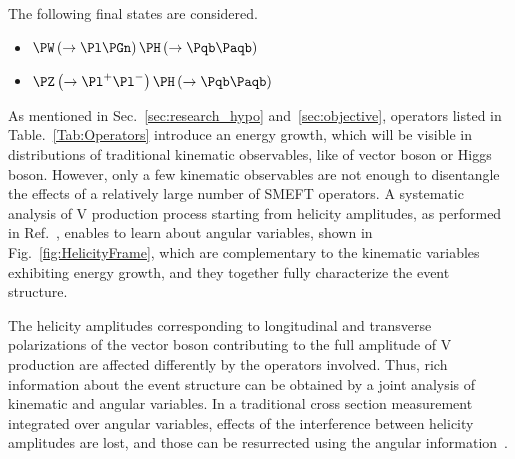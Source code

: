 \documentclass[a4paper,11pt]{article}
\newcommand{\Pb}{{{\Pqb}}\xspace}
\newcommand{\PAb}{{{{\Paqb}}}\xspace}
\renewcommand{\PV}{{{{V}}}\xspace}
\newcommand{\VH}{{{\PV}{\PH}}\xspace}
\begin{document}
The following final states are considered.
\begin{itemize}
\item $\PW\left(\to \Pl \Pgn \right) \PH \left(\to \Pb \PAb \right)$
\item $\PZ\left(\to {\Pl}^{+} {\Pl}^{-} \right) \PH \left(\to \Pb \PAb \right)$
\end{itemize}

As mentioned in Sec.~\ref{sec:research_hypo} and~\ref{sec:objective}, operators listed in Table.~\ref{Tab:Operators} introduce an energy growth, which will be visible in distributions of traditional kinematic observables, like \pt of vector boson or Higgs boson. 
However, only a few kinematic observables are not enough to disentangle the effects of a relatively large number of SMEFT operators. 
A systematic analysis of \VH production process starting from helicity amplitudes, 
as performed in Ref.~\cite{Banerjee:2019twi}, 
enables to learn about angular variables, shown in Fig.~\ref{fig:HelicityFrame}, 
which are complementary to the kinematic variables exhibiting energy growth, and 
they together fully characterize the event structure.

The helicity amplitudes corresponding to longitudinal and transverse polarizations of the vector boson contributing to the full amplitude of \VH production are affected differently by the operators involved.
Thus, rich information about the event structure can be obtained by a joint analysis of kinematic and angular variables.
In a traditional cross section measurement integrated over angular variables, 
effects of the interference between helicity amplitudes are lost, and those can be resurrected using the angular information~\cite{Panico:2017frx}.
\end{document}
